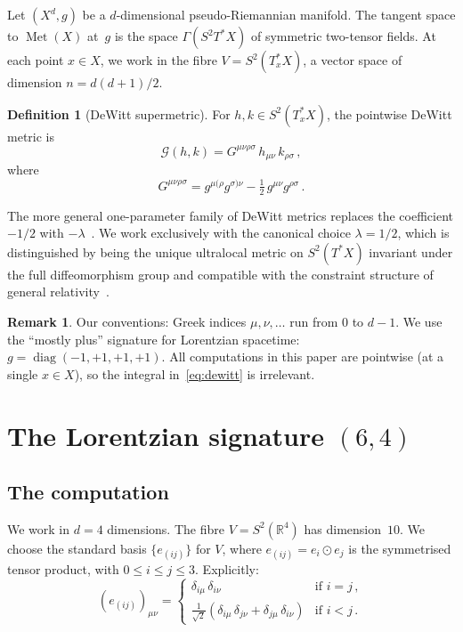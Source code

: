 \documentclass[12pt,a4paper]{article}
\theoremstyle{definition}
\newtheorem{definition}[theorem]{Definition}
\newtheorem{remark}[theorem]{Remark}
\newcommand{\Met}{\operatorname{Met}}
\newcommand{\diag}{\operatorname{diag}}
\newcommand{\R}{\mathbb{R}}
\begin{document}
Let $(X^d, g)$ be a $d$-dimensional pseudo-Riemannian manifold.
The tangent space to $\Met(X)$ at~$g$ is the space $\Gamma(S^2 T^*X)$ of symmetric two-tensor fields.
At each point $x \in X$, we work in the fibre $V = S^2(T_x^*X)$, a vector space of dimension $n = d(d{+}1)/2$.

\begin{definition}[DeWitt supermetric]
\label{def:dewitt}
For $h, k \in S^2(T_x^*X)$, the pointwise DeWitt metric is
\begin{equation}
\label{eq:G_DW}
\mathcal{G}(h,k) = G^{\mu\nu\rho\sigma}\, h_{\mu\nu}\, k_{\rho\sigma}\,,
\end{equation}
where
\begin{equation}
\label{eq:G_components}
G^{\mu\nu\rho\sigma} = g^{\mu(\rho} g^{\sigma)\nu} - \tfrac{1}{2}\, g^{\mu\nu} g^{\rho\sigma}\,.
\end{equation}
\end{definition}

The more general one-parameter family of DeWitt metrics replaces the coefficient $-1/2$ with $-\lambda$~\cite{Giulini2009}.
We work exclusively with the canonical choice $\lambda = 1/2$, which is distinguished by being the unique ultralocal metric on $S^2(T^*X)$ invariant under the full diffeomorphism group and compatible with the constraint structure of general relativity~\cite{DeWitt1967,Giulini2009}.

\begin{remark}
\label{rem:conventions}
Our conventions: Greek indices $\mu, \nu, \ldots$ run from $0$ to $d{-}1$.
We use the ``mostly plus'' signature for Lorentzian spacetime: $g = \diag(-1,+1,+1,+1)$.
All computations in this paper are pointwise (at a single $x \in X$), so the integral in~\eqref{eq:dewitt} is irrelevant.
\end{remark}


\section{The Lorentzian signature \texorpdfstring{$(6,4)$}{(6,4)}}
\label{sec:signature}

\subsection{The computation}

We work in $d = 4$ dimensions.
The fibre $V = S^2(\R^4)$ has dimension~$10$.
We choose the standard basis $\{e_{(ij)}\}$ for $V$, where $e_{(ij)} = e_i \odot e_j$ is the symmetrised tensor product, with $0 \le i \le j \le 3$.
Explicitly:
\begin{equation}
(e_{(ij)})_{\mu\nu} =
\begin{cases}
\delta_{i\mu}\,\delta_{i\nu} & \text{if } i = j\,,\\
\tfrac{1}{\sqrt{2}}(\delta_{i\mu}\,\delta_{j\nu} + \delta_{j\mu}\,\delta_{i\nu}) & \text{if } i < j\,.
\end{cases}
\end{equation}
\end{document}
